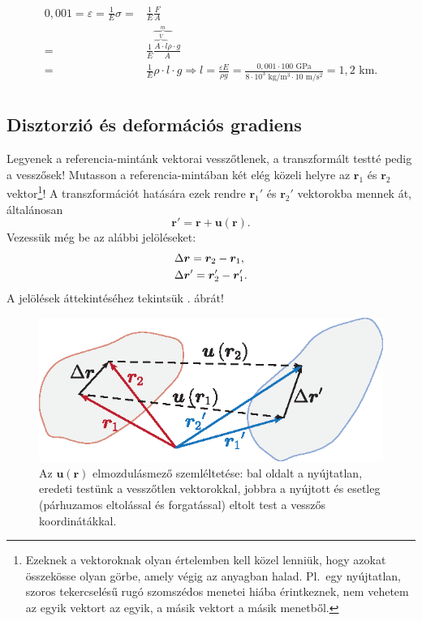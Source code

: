 \documentclass[12pt,a4paper]{scrartcl}
\let\mathbf\bm
\begin{document}
\[\begin{aligned}
  0{,}001 = \varepsilon  = \frac{1}{E}\sigma  =  & \frac{1}{E}\frac{F}{A} \\ 
   =  & \frac{1}{E}\frac{{\overbrace {\overbrace {A \cdot l}^V \rho }^m \cdot g}}{A} \\ 
   =  & \frac{1}{E}\rho  \cdot l \cdot g \Rightarrow l = \frac{{\varepsilon E}}{{\rho g}} = \frac{{0,001 \cdot 100{\text{ GPa}}}}{{8 \cdot {{10}^3}{\text{ kg}}/{{\text{m}}^3} \cdot 10{\text{ m}}/{{\text{s}}^2}}} = 1{,}2{\text{ km.}} \\ 
\end{aligned} \]

\subsection{Disztorzió és deformációs gradiens}
Legyenek a referencia-mintánk vektorai vesszőtlenek, a transzformált testté pedig a vesszősek! Mutasson a referencia-mintában két elég közeli helyre az ${{\mathbf{r}}_1}$ és ${{\mathbf{r}}_2}$ vektor\footnote{Ezeknek a vektoroknak olyan értelemben kell közel lenniük, hogy azokat összekösse olyan görbe, amely végig az anyagban halad. Pl.\ egy nyújtatlan, szoros tekercselésű rugó szomszédos menetei hiába érintkeznek, nem vehetem az egyik vektort az egyik, a másik vektort a másik menetből.}! A transzformációt hatására ezek rendre ${\mathbf{r}}_1'$ és ${\mathbf{r}}_2'$ vektorokba mennek át, általánosan \[{\mathbf{r}}' = {\mathbf{r}} + {\mathbf{u}}\left( {\mathbf{r}} \right).\]
Vezessük még be az alábbi jelöléseket:
\[\begin{gathered}
  \Delta {\mathbf{r}} = {{\mathbf{r}}_2} - {{\mathbf{r}}_1}, \hfill \\
  \Delta {\mathbf{r}}' = {{\mathbf{r}}_2'} - {{\mathbf{r}}_1'}. \hfill \\ 
\end{gathered} \]
A jelölések áttekintéséhez tekintsük . ábrát!
\begin{figure}[htb] 
\centering    
\includegraphics[scale=1]{figs/u.eps}
\caption{Az ${\mathbf{u}}\left( {\mathbf{r}} \right)$ elmozdulásmező szemléltetése: bal oldalt a nyújtatlan, eredeti testünk a vesszőtlen vektorokkal, jobbra a nyújtott és esetleg (párhuzamos eltolással és forgatással) eltolt test a vesszős koordinátákkal.}
\label{fig:u}
\end{figure}
\FloatBarrier
\end{document}
